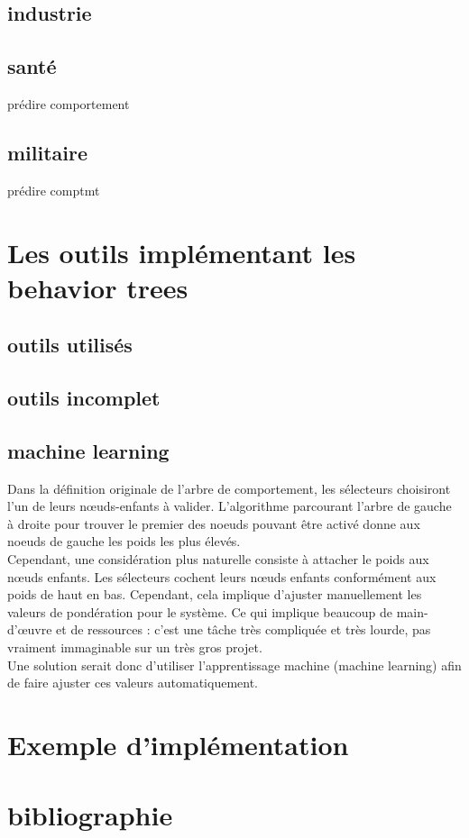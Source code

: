 \documentclass[titlepage]{article}
\begin{document}
		\subsection{industrie}
	
		\subsection{santé}
	prédire comportement
	
		\subsection{militaire}
	prédire comptmt
	
	\clearpage
	\section{Les outils implémentant les behavior trees}
		\subsection{outils utilisés}
		\subsection{outils incomplet}
		\subsection{machine learning}
		Dans la définition originale de l’arbre de comportement, les sélecteurs choisiront l’un de leurs nœuds-enfants à valider. L’algorithme parcourant l'arbre de gauche à droite pour trouver le premier des noeuds pouvant être activé donne aux noeuds de gauche les poids les plus élevés. \cite{Fu2016/08}
		\\
		Cependant, une considération plus naturelle consiste à attacher le poids aux nœuds enfants. Les sélecteurs cochent leurs nœuds enfants conformément aux poids de haut en bas. Cependant, cela implique d'ajuster manuellement les valeurs de pondération pour le système. Ce qui implique beaucoup de main-d'œuvre et de ressources : c'est une tâche très compliquée et très lourde, pas vraiment immaginable sur un très gros projet. \cite{Fu2016/08}
		\\
		Une solution serait donc d'utiliser l'apprentissage machine (machine learning) afin de faire ajuster ces valeurs automatiquement.
	
	\clearpage
	\section{Exemple d'implémentation}
	
	\clearpage
	\section{bibliographie}
	
	
	
\end{document}

